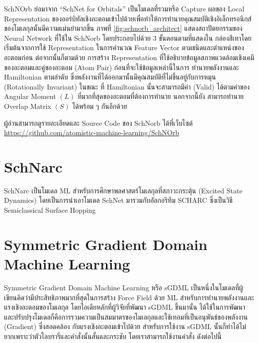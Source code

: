 SchNOrb ย่อมาจาก \enquote{SchNet for Orbitals}\autocite{schutt2019a} เป็นโมเดลที่รวมหรือ Capture ผลของ Local 
Representation ของออร์บิทัลเชิงอะตอมเข้าไปด้วยเพื่อทำให้การทำนายคุณสมบัติเชิงอิเล็กทรอนิกส์ของโมเลกุลนั้นมีความแม่นยำมากขึ้น ภาพที่ 
\ref{fig:schnorb_architect} แสดงสถาปัตยกรรมของ Neural Network ที่ใช้ใน SchNorb โดยประกอบไปด้วย 3 ขั้นตอนตามที่แสดงใน%
กล่องสีเทาโดยเริ่มต้นจากการใช้ Representation ในการคำนวณ Feature Vector ตามชนิดและตำแหน่งของอะตอมก่อน ต่อจากนั้นก็ตามด้วย%
การสร้าง Representation ที่ใช้อธิบายข้อมูลสภาพแวดล้อมเชิงเคมีของอะตอมและคู่ของอะตอม (Atom Pair) ก่อนที่จะใช้ข้อมูลเหล่านี้ในการ%
ทำนายพลังงานและ Hamiltonian ตามลำดับ ซึ่งพลังงานที่ได้ออกมานั้นมีคุณสมบัติที่ไม่ขึ้นอยู่กับการหมุน (Rotationally Invariant) ในขณะ%
ที่ Hamiltonian นั้นจะสามารถมีค่า (Valid) ได้ตามค่าของ Angular Moment $(L)$ ที่มากที่สุดของอะตอมที่ต้องการทำนาย นอกจากนี้ยัง%
สามารถทำนาย Overlap Matrix $(S)$ ได้พร้อม ๆ กันอีกด้วย 

ผู้อ่านสามารถดูรายละเอียดและ Source Code ของ SchNorb ได้ที่เว็บไซต์ \url{https://github.com/atomistic-machine-learning/SchNOrb}

\section{SchNarc}
\label{sec:schnarc}

SchNarc เป็นโมเดล ML สำหรับการศึกษาพลศาสตร์โมเลกุลที่สภาวะกระตุ้น (Excited State Dynamics)\autocite{westermayr2020} 
โดยเป็นการนำเอาโมเดล SchNet\autocite{schutt2017,schutt2018} มารวมกับอัลกอริทึม SCHARC\autocite{richter2011,mai2018} 
ซึ่งเป็นวิธี Semiclassical Surface Hopping

\section{Symmetric Gradient Domain Machine Learning}
\label{sec:sgdml}

Symmetric Gradient Domain Machine Learning หรือ sGDML เป็นหนึ่งในโมเดลที่ผู้เขียนคิดว่ามีประสิทธิภาพมากที่สุดในการสร้าง Force 
Field ด้วย ML สำหรับการทำนายพลังงานและแรงเชิงอะตอมของโมเลกุล%
\autocite{chmiela2017,chmiela2018,sauceda2020,chmiela2020,chmiela2022} โดยไอเดียหลักที่ผู้วิจัยที่พัฒนา sGDML ขึ้นมานั้น%
ได้ใช้ในการพัฒนาและปรับปรุงโมเดลก็คือการรวมความเป็นสมมาตรของโมเลกุลและใช้เทอมที่เป็นอนุพันธ์ของพลังงาน (Gradient) ซึ่งสอดคล้อง%
กับแรงเชิงอะตอมเข้าไปด้วย สำหรับการใช้งาน sGDML นั้นก็ทำได้ไม่ยากเพราะว่าตัวไลบรารี่และคำสั่งนั้นสั้นและกระชับ โดยเราสามารถใช้งานคำสั่ง%
ดังต่อไปนี้

